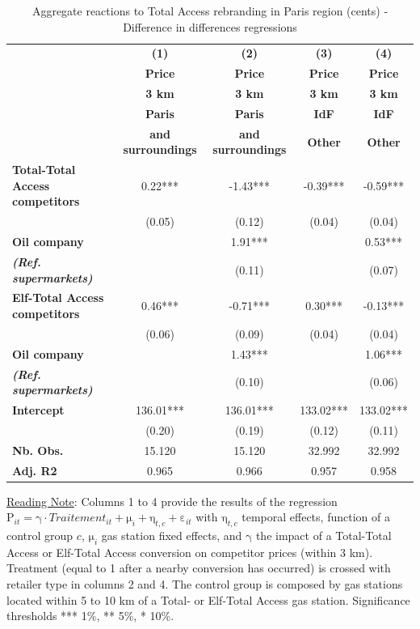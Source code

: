 \documentclass[english]{article}
\begin{document}
\begin{table}
\caption{Aggregate reactions to Total Access rebranding in Paris region (cents) - Difference in differences regressions}
\label{tab:paris_comp_reaction_dd_regs}
\begin{threeparttable}
\begin{footnotesize}
\begin{tabular}{l|cccc}
\hline
\hline
 & \textbf{(1)}  & \textbf{(2)}  & \textbf{(3)}  & \textbf{(4) }\tabularnewline
 & \textbf{Price}  & \textbf{Price}  & \textbf{Price}  & \textbf{Price}\tabularnewline
 & \textbf{3 km}  & \textbf{3 km}  & \textbf{3 km}  & \textbf{3 km}\tabularnewline
\hline
 & \textbf{Paris}  & \textbf{Paris}  & \textbf{IdF}  & \textbf{IdF}\tabularnewline
 & \textbf{and surroundings}  & \textbf{and surroundings}  & \textbf{Other}  & \textbf{Other}\tabularnewline
\hline
\textbf{Total-Total Access competitors}  & 0.22{*}{*}{*}  & -1.43{*}{*}{*}  & -0.39{*}{*}{*}  & -0.59{*}{*}{*}\tabularnewline
 & (0.05)  & (0.12)  & (0.04)  & (0.04)\tabularnewline
\textbf{Oil company}  &  & 1.91{*}{*}{*}  &  & 0.53{*}{*}{*}\tabularnewline
\textbf{\textit{(Ref. supermarkets)}}  &  & (0.11)  &  & (0.07)\tabularnewline
\hline
\textbf{Elf-Total Access competitors}  & 0.46{*}{*}{*}  & -0.71{*}{*}{*}  & 0.30{*}{*}{*}  & -0.13{*}{*}{*}\tabularnewline
 & (0.06)  & (0.09)  & (0.04)  & (0.04)\tabularnewline
\textbf{Oil company}  &  & 1.43{*}{*}{*}  &  & 1.06{*}{*}{*}\tabularnewline
\textbf{\textit{(Ref. supermarkets)}}  &  & (0.10)  &  & (0.06)\tabularnewline
\hline
\textbf{Intercept}  & 136.01{*}{*}{*}  & 136.01{*}{*}{*}  & 133.02{*}{*}{*}  & 133.02{*}{*}{*}\tabularnewline
 & (0.20)  & (0.19)  & (0.12)  & (0.11)\tabularnewline
\hline
\textbf{Nb. Obs.}  & 15.120  & 15.120  & 32.992  & 32.992\tabularnewline
\textbf{Adj. R2}  & 0.965  & 0.966  & 0.957  & 0.958\tabularnewline
\hline
\hline
\end{tabular}
\end{footnotesize}
\end{threeparttable}
\parbox{\textwidth}{\footnotesize%
\vspace{2eX} %
{\footnotesize{}\uline{Reading Note}}{\footnotesize{}: } Columns 1 to 4 provide the results of the regression $\mathrm{P}_{it}=\mathrm{\gamma}\cdot Traitement_{it}+\mathrm{\mu}_{i}+\mathrm{\eta}_{t,c}+\mathrm{\varepsilon}_{it}$
with $\mathrm{\eta}_{t,c}$ temporal effects, function of a control group $c$, $\mathrm{\mu}_{i}$ gas station fixed effects, and $\mathrm{\gamma}$ the impact of a Total-Total Access or Elf-Total Access conversion on competitor prices (within 3 km). Treatment (equal to 1 after a nearby conversion has occurred) is crossed with retailer type in columns 2 and 4. The control group is composed by gas stations located within 5 to 10 km of a Total- or Elf-Total Access gas station. Significance thresholds {*}{*}{*} 1\%, {*}{*} 5\%, {*} 10\%.}
\end{table}
\end{document}
